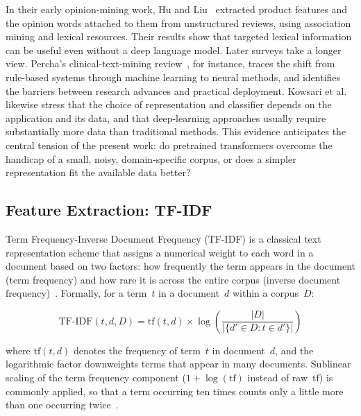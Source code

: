 In their early opinion-mining work, Hu and Liu~\cite{hu2004mining} extracted product features and the opinion words attached to them from unstructured reviews, using association mining and lexical resources. Their results show that targeted lexical information can be useful even without a deep language model. Later surveys take a longer view. Percha's clinical-text-mining review~\cite{percha2021modern}, for instance, traces the shift from rule-based systems through machine learning to neural methods, and identifies the barriers between research advances and practical deployment. Kowsari et al.~\cite{kowsari2019text} likewise stress that the choice of representation and classifier depends on the application and its data, and that deep-learning approaches usually require substantially more data than traditional methods. This evidence anticipates the central tension of the present work: do pretrained transformers overcome the handicap of a small, noisy, domain-specific corpus, or does a simpler representation fit the available data better?

\subsection{Feature Extraction: TF-IDF}
\label{sec:tfidf}

Term Frequency-Inverse Document Frequency (TF-IDF) is a classical text representation scheme that assigns a numerical weight to each word in a document based on two factors: how frequently the term appears in the document (term frequency) and how rare it is across the entire corpus (inverse document frequency)~\cite{salton1988term, manning2008introduction}. Formally, for a term~$t$ in a document~$d$ within a corpus~$D$:

\begin{equation}
\text{TF-IDF}(t, d, D) = \text{tf}(t, d) \times \log\!\left(\frac{|D|}{|\{d' \in D : t \in d'\}|}\right)
\label{eq:tfidf}
\end{equation}

\noindent where $\text{tf}(t, d)$ denotes the frequency of term~$t$ in document~$d$, and the logarithmic factor downweights terms that appear in many documents. Sublinear scaling of the term frequency component ($1 + \log(\text{tf})$ instead of raw~$\text{tf}$) is commonly applied, so that a term occurring ten times counts only a little more than one occurring twice~\cite{manning2008introduction}.

